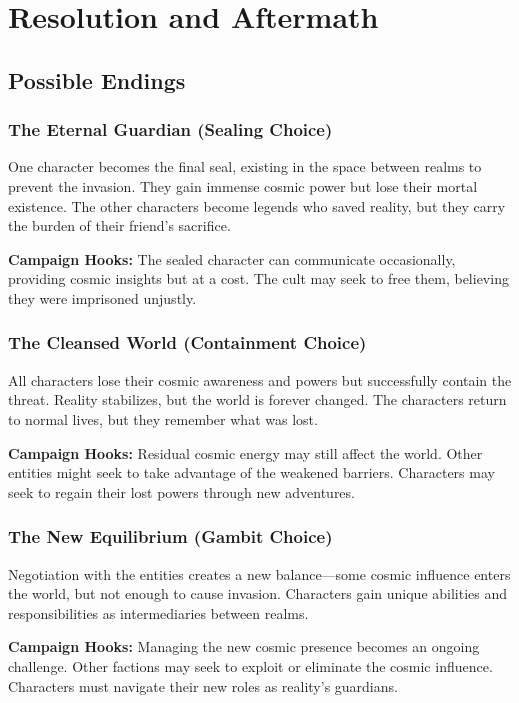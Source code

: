 \documentclass[12pt,twoside]{article}
\begin{document}
\section{Resolution and Aftermath}

\subsection{Possible Endings}

\subsubsection{The Eternal Guardian (Sealing Choice)}
One character becomes the final seal, existing in the space between realms to prevent the invasion. They gain immense cosmic power but lose their mortal existence. The other characters become legends who saved reality, but they carry the burden of their friend's sacrifice.

\textbf{Campaign Hooks:} The sealed character can communicate occasionally, providing cosmic insights but at a cost. The cult may seek to free them, believing they were imprisoned unjustly.

\subsubsection{The Cleansed World (Containment Choice)}
All characters lose their cosmic awareness and powers but successfully contain the threat. Reality stabilizes, but the world is forever changed. The characters return to normal lives, but they remember what was lost.

\textbf{Campaign Hooks:} Residual cosmic energy may still affect the world. Other entities might seek to take advantage of the weakened barriers. Characters may seek to regain their lost powers through new adventures.

\subsubsection{The New Equilibrium (Gambit Choice)}
Negotiation with the entities creates a new balance---some cosmic influence enters the world, but not enough to cause invasion. Characters gain unique abilities and responsibilities as intermediaries between realms.

\textbf{Campaign Hooks:} Managing the new cosmic presence becomes an ongoing challenge. Other factions may seek to exploit or eliminate the cosmic influence. Characters must navigate their new roles as reality's guardians.
\end{document}
